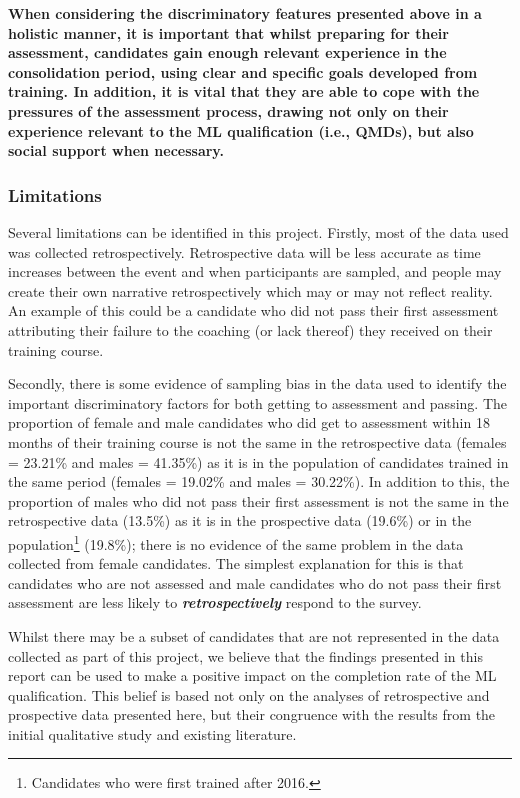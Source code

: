 \documentclass[a4paper,]{book}
\begin{document}
\textbf{When considering the discriminatory features presented above in a holistic manner, it is important that whilst preparing for their assessment, candidates gain enough relevant experience in the consolidation period, using clear and specific goals developed from training. In addition, it is vital that they are able to cope with the pressures of the assessment process, drawing not only on their experience relevant to the ML qualification (i.e., QMDs), but also social support when necessary.}

\hypertarget{limitations}{%
\subsubsection{Limitations}\label{limitations}}

Several limitations can be identified in this project. Firstly, most of the data used was collected retrospectively. Retrospective data will be less accurate as time increases between the event and when participants are sampled, and people may create their own narrative retrospectively which may or may not reflect reality. An example of this could be a candidate who did not pass their first assessment attributing their failure to the coaching (or lack thereof) they received on their training course.

Secondly, there is some evidence of sampling bias in the data used to identify the important discriminatory factors for both getting to assessment and passing. The proportion of female and male candidates who did get to assessment within 18 months of their training course is not the same in the retrospective data (females = 23.21\% and males = 41.35\%) as it is in the population of candidates trained in the same period (females = 19.02\% and males = 30.22\%). In addition to this, the proportion of males who did not pass their first assessment is not the same in the retrospective data (13.5\%) as it is in the prospective data (19.6\%) or in the population\footnote{Candidates who were first trained after 2016.} (19.8\%); there is no evidence of the same problem in the data collected from female candidates. The simplest explanation for this is that candidates who are not assessed and male candidates who do not pass their first assessment are less likely to \emph{\textbf{retrospectively}} respond to the survey.

Whilst there may be a subset of candidates that are not represented in the data collected as part of this project, we believe that the findings presented in this report can be used to make a positive impact on the completion rate of the ML qualification. This belief is based not only on the analyses of retrospective and prospective data presented here, but their congruence with the results from the initial qualitative study and existing literature.
\end{document}
